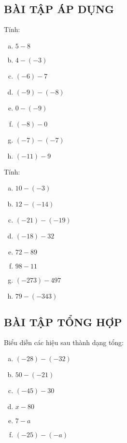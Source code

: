 \subsection{BÀI TẬP ÁP DỤNG}
\begin{bt}  
Tính:
\begin{multicols}{2}
\begin{enumerate}[a)]
\item $5-8$
\item $4-(-3)$
\item $(-6)- 7$
\item $(-9)-(-8)$
\item $0 - (-9)$
\item $(-8) - 0$
\item $(-7)- (-7)$
\item $(-11)-9$
\end{enumerate}
\end{multicols}


\end{bt}   \begin{bt}
Tính:
\begin{multicols}{2}
\begin{enumerate}[a)]
\item $10 - (-3)$
\item $12 -(-14)$
\item $(-21) - (-19)$
\item $(-18)-32$
\item $72-89$
\item $98-11$
\item $(-273)-497$
\item $79 - (-343)$
\end{enumerate}
\end{multicols}
\subsection{BÀI TẬP TỔNG HỢP}
\end{bt}   \begin{bt} 
Biểu diễn các hiệu sau thành dạng tổng:
\begin{multicols}{2}
\begin{enumerate}[a)]
\item $(-28)-(-32)$
\item $50 - (-21)$
\item $(-45)-30$
\item $x-80$
\item $7-a$
\item $(-25) - (-a)$
\end{enumerate}
\end{multicols}


\end{bt}
